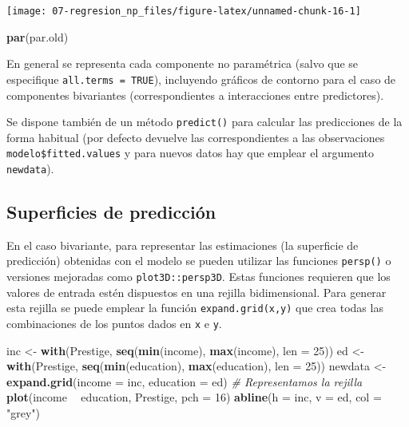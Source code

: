 \documentclass[
  spanish,
]{book}
\newenvironment{Shaded}{\begin{snugshade}}{\end{snugshade}}
\newcommand{\CommentTok}[1]{\textcolor[rgb]{0.56,0.35,0.01}{\textit{#1}}}
\newcommand{\DataTypeTok}[1]{\textcolor[rgb]{0.13,0.29,0.53}{#1}}
\newcommand{\DecValTok}[1]{\textcolor[rgb]{0.00,0.00,0.81}{#1}}
\newcommand{\KeywordTok}[1]{\textcolor[rgb]{0.13,0.29,0.53}{\textbf{#1}}}
\newcommand{\NormalTok}[1]{#1}
\newcommand{\OperatorTok}[1]{\textcolor[rgb]{0.81,0.36,0.00}{\textbf{#1}}}
\newcommand{\StringTok}[1]{\textcolor[rgb]{0.31,0.60,0.02}{#1}}
\theoremstyle{break}
\theoremstyle{definition}
\theoremstyle{definition}
\theoremstyle{definition}
\theoremstyle{remark}
\begin{document}
\begin{center}\texttt{[image: 07-regresion\_np\_files/figure-latex/unnamed-chunk-16-1]} \end{center}

\begin{Shaded}
\begin{Highlighting}[]
\KeywordTok{par}\NormalTok{(par.old)}
\end{Highlighting}
\end{Shaded}

En general se representa cada componente no paramétrica (salvo que se especifique \texttt{all.terms\ =\ TRUE}), incluyendo gráficos de contorno para el caso de componentes bivariantes (correspondientes a interacciones entre predictores).

Se dispone también de un método \texttt{predict()} para calcular las predicciones de la forma habitual (por defecto devuelve las correspondientes a las observaciones \texttt{modelo\$fitted.values} y para nuevos datos hay que emplear el argumento \texttt{newdata}).

\hypertarget{superficies-de-predicciuxf3n}{%
\subsection{Superficies de predicción}\label{superficies-de-predicciuxf3n}}

En el caso bivariante, para representar las estimaciones (la superficie de predicción) obtenidas con el modelo se pueden utilizar las funciones \texttt{persp()} o versiones mejoradas como \texttt{plot3D::persp3D}.
Estas funciones requieren que los valores de entrada estén dispuestos en una rejilla bidimensional.
Para generar esta rejilla se puede emplear la función \texttt{expand.grid(x,y)} que crea todas las combinaciones de los puntos dados en \texttt{x} e \texttt{y}.

\begin{Shaded}
\begin{Highlighting}[]
\NormalTok{inc <-}\StringTok{ }\KeywordTok{with}\NormalTok{(Prestige, }\KeywordTok{seq}\NormalTok{(}\KeywordTok{min}\NormalTok{(income), }\KeywordTok{max}\NormalTok{(income), }\DataTypeTok{len =} \DecValTok{25}\NormalTok{))}
\NormalTok{ed <-}\StringTok{ }\KeywordTok{with}\NormalTok{(Prestige, }\KeywordTok{seq}\NormalTok{(}\KeywordTok{min}\NormalTok{(education), }\KeywordTok{max}\NormalTok{(education), }\DataTypeTok{len =} \DecValTok{25}\NormalTok{))}
\NormalTok{newdata <-}\StringTok{ }\KeywordTok{expand.grid}\NormalTok{(}\DataTypeTok{income =}\NormalTok{ inc, }\DataTypeTok{education =}\NormalTok{ ed)}
\CommentTok{# Representamos la rejilla}
\KeywordTok{plot}\NormalTok{(income }\OperatorTok{~}\StringTok{ }\NormalTok{education, Prestige, }\DataTypeTok{pch =} \DecValTok{16}\NormalTok{)}
\KeywordTok{abline}\NormalTok{(}\DataTypeTok{h =}\NormalTok{ inc, }\DataTypeTok{v =}\NormalTok{ ed, }\DataTypeTok{col =} \StringTok{"grey"}\NormalTok{)}
\end{Highlighting}
\end{Shaded}
\end{document}
